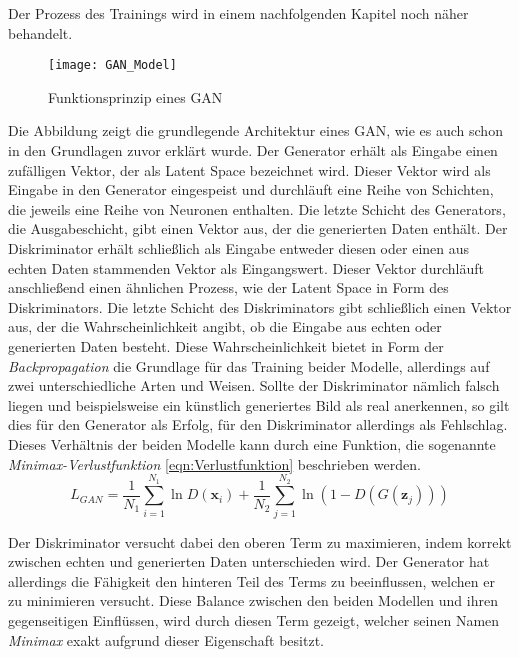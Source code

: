 \noindent Der Prozess des Trainings wird in einem nachfolgenden Kapitel noch näher behandelt. 

\newpage

\begin{figure}[h]
    \centering
    \texttt{[image: GAN\_Model]}
    \caption{Funktionsprinzip eines \ac{GAN}}
    \label{Abb:basic}
    \end{figure}

    \noindent Die Abbildung zeigt die grundlegende Architektur eines \ac{GAN}, wie es auch schon in den Grundlagen zuvor erklärt wurde. Der Generator erhält als Eingabe einen zufälligen Vektor, der als Latent Space bezeichnet wird. Dieser Vektor wird als Eingabe in den Generator eingespeist und durchläuft eine Reihe von Schichten, die jeweils eine Reihe von Neuronen enthalten. Die letzte Schicht des Generators, die Ausgabeschicht, gibt einen Vektor aus, der die generierten Daten enthält. Der Diskriminator erhält schließlich als Eingabe entweder diesen oder einen aus echten Daten stammenden Vektor als Eingangswert. Dieser Vektor durchläuft anschließend einen ähnlichen Prozess, wie der Latent Space in Form des Diskriminators. Die letzte Schicht des Diskriminators gibt schließlich einen Vektor aus, der die Wahrscheinlichkeit angibt, ob die Eingabe aus echten oder generierten Daten besteht. Diese Wahrscheinlichkeit bietet in Form der \textit{Backpropagation} die Grundlage für das Training beider Modelle, allerdings auf zwei unterschiedliche Arten und Weisen. Sollte der Diskriminator nämlich falsch liegen und beispielsweise ein künstlich generiertes Bild als real anerkennen, so gilt dies für den Generator als Erfolg, für den Diskriminator allerdings als Fehlschlag. Dieses Verhältnis der beiden Modelle kann durch eine Funktion, die sogenannte \textit{Minimax-Verlustfunktion} \ref{eqn:Verlustfunktion} beschrieben werden.\\

    \begin{equation}
        \label{eqn:Verlustfunktion}
        L_{GAN}=\frac{1}{N_1}\sum_{i=1}^{N_1} \ln{D (\textbf{x}_i)} + \frac{1}{N_2}\sum_{j=1}^{N_2} \ln{(1-D (G (\textbf{z}_j)))}
        \end{equation}

    \noindent Der Diskriminator versucht dabei den oberen Term zu maximieren, indem korrekt zwischen echten und generierten Daten unterschieden wird. Der Generator hat allerdings die Fähigkeit den hinteren Teil des Terms zu beeinflussen, welchen er zu minimieren versucht. Diese Balance zwischen den beiden Modellen und ihren gegenseitigen Einflüssen, wird durch diesen Term gezeigt, welcher seinen Namen \textit{Minimax} exakt aufgrund dieser Eigenschaft besitzt. \\

